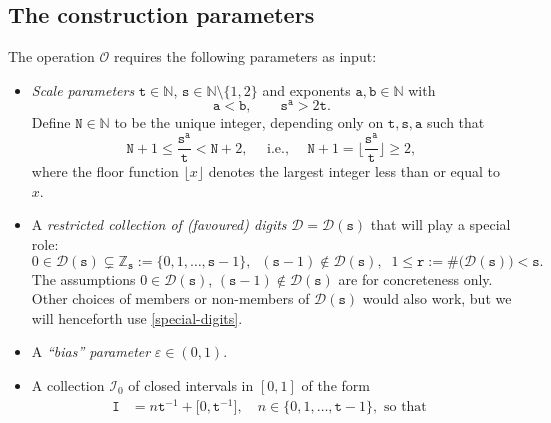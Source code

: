 \documentclass[12pt, twoside]{article}
\theoremstyle{definition}
\numberwithin{equation}{section}
\begin{document}
\subsection{The construction parameters} \label{param-elem-op-section}
The operation $\mathscr{O}$ requires the following parameters as input:
\begin{itemize}  
\item {\em{Scale parameters}} $\mathtt t \in \mathbb N$, $\mathtt s \in \mathbb N \setminus \{1, 2\}$ and exponents $\mathtt a, \mathtt b \in \mathbb N$ with 
\begin{equation} 
\mathtt a < \mathtt b, \qquad \mathtt s^{\mathtt a} > 2\mathtt t.
\end{equation}  
Define $\mathtt N \in \mathbb N$ to be the unique integer, depending only on $\mathtt t, \mathtt s, \mathtt a$ such that 
\begin{equation} \label{N}
\mathtt N + 1 \leq \frac{\mathtt s^{\mathtt a}}{\mathtt t} < \mathtt N+2, \quad \text{ i.e., } \quad \mathtt N + 1 = \lfloor \frac{\mathtt s^{\mathtt a}}{\mathtt t} \rfloor \geq 2,
\end{equation}  
where the floor function $\lfloor x \rfloor$ denotes the largest integer less than or equal to $x$.
\item A {\em{restricted collection of (favoured) digits}}  $\mathscr{D} = \mathscr{D}(\mathtt s)$ that will play a special role:
\begin{equation} \label{special-digits} 
0 \in \mathscr{D}(\mathtt s) \subsetneq \mathbb Z_{\mathtt s} := \{0, 1, \ldots, \mathtt s-1\}, \; \; (\mathtt s-1) \not\in \mathscr{D}(\mathtt s), \; \; 1 \leq \mathtt r := \# \bigl(\mathscr{D}(\mathtt s) \bigr) < \mathtt s. 
\end{equation}  
The assumptions $0 \in \mathscr{D}(\mathtt s)$, $(\mathtt s-1) \not\in \mathscr{D}(\mathtt s)$ are for concreteness only. Other choices of members or non-members of $\mathscr{D}(\mathtt s)$ would also work, but we will henceforth use \eqref{special-digits}.  
\item A {\em{``bias'' parameter}} $\varepsilon \in (0,1)$.  
\item A collection $\mathscr{I}_0$ of closed intervals in $[0, 1]$ of the form 
\begin{align} 
\mathtt I &= n \mathtt t^{-1} + \bigl[0, \mathtt t^{-1} \bigr], \quad n \in \{0, 1, \ldots, \mathtt t-1\}, \text{ so that } \label{I0-1} \\   

\end{align}
\end{itemize}
\end{document}
